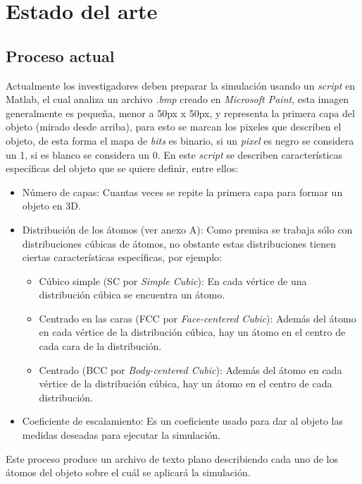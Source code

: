 \section{Estado del arte}

\subsection{Proceso actual}
Actualmente los investigadores deben preparar la simulación usando un \emph{script} en Matlab\textregistered, el cual analiza un archivo \emph{.bmp} creado en \emph{Microsoft Paint\textregistered}, esta imagen generalmente es pequeña, menor a 50px x 50px, y representa la primera capa del objeto (mirado desde arriba), para esto se marcan los pixeles que describen el objeto, de esta forma el mapa de \emph{bits} es binario, si un \emph{pixel} es negro se considera un 1, si es blanco se considera un 0. En este \emph{script} se describen características específicas del objeto que se quiere definir, entre ellos:
\begin{itemize}
	\item Número de capas: Cuantas veces se repite la primera capa para formar un objeto en 3D.
	\item Distribución de los átomos (ver anexo A): Como premisa se trabaja sólo con distribuciones cúbicas de átomos, no obstante estas distribuciones tienen ciertas características específicas, por ejemplo:
	\begin{itemize}
		\item Cúbico simple (SC por \emph{Simple Cubic}): En cada vértice de una distribución cúbica se encuentra un átomo.
		\item Centrado en las caras (FCC por \emph{Face-centered Cubic}): Además del átomo en cada vértice de la distribución cúbica, hay un átomo en el centro de cada cara de la distribución.
		\item Centrado (BCC por \emph{Body-centered Cubic}):  Además del átomo en cada vértice de la distribución cúbica, hay un átomo en el centro de cada distribución.
	\end{itemize}
	\item Coeficiente de escalamiento: Es un coeficiente usado para dar al objeto las medidas deseadas para ejecutar la simulación.
\end{itemize}

Este proceso produce un archivo de texto plano describiendo cada uno de los átomos del objeto sobre el cuál se aplicará la simulación.

